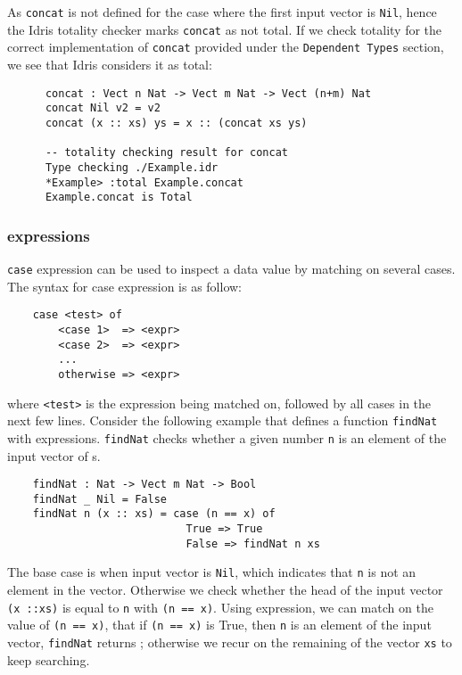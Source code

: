 As \texttt{concat} is not defined for the case where the first input vector is \texttt{Nil}, hence the Idris totality checker marks \texttt{concat} as not total. If we check totality for the correct implementation of \texttt{concat} provided under the \texttt{Dependent Types} section, we see that Idris considers it as total: 
\begin{lstlisting}
      concat : Vect n Nat -> Vect m Nat -> Vect (n+m) Nat
      concat Nil v2 = v2
      concat (x :: xs) ys = x :: (concat xs ys)

      -- totality checking result for concat
      Type checking ./Example.idr
      *Example> :total Example.concat
      Example.concat is Total
 \end{lstlisting}


\subsubsection*{\textbf{} expressions}
\texttt{case} expression can be used to inspect a data value by matching on several cases. The syntax for case expression is as follow: 
\begin{lstlisting}
    case <test> of
        <case 1>  => <expr>
        <case 2>  => <expr>
        ...
        otherwise => <expr>
\end{lstlisting}
where \texttt{<test>} is the expression being matched on, followed by all cases in the next few lines. 
Consider the following example that defines a function \texttt{findNat} with  expressions. \texttt{findNat} checks whether a given number \texttt{n} is an element of the input vector of s. 
\begin{lstlisting}
    findNat : Nat -> Vect m Nat -> Bool
    findNat _ Nil = False
    findNat n (x :: xs) = case (n == x) of 
                            True => True
                            False => findNat n xs
\end{lstlisting}

The base case is when input vector is \texttt{Nil}, which indicates that \texttt{n} is not an element in the vector. Otherwise we check whether the head of the input vector \texttt{(x ::xs)} is equal to \texttt{n} with \texttt{(n == x)}. Using  expression, we can match on the value of \texttt{(n == x)}, that if \texttt{(n == x)} is True, then \texttt{n} is an element of the input vector, \texttt{findNat} returns ; otherwise we recur on the remaining of the vector \texttt{xs} to keep searching. 


